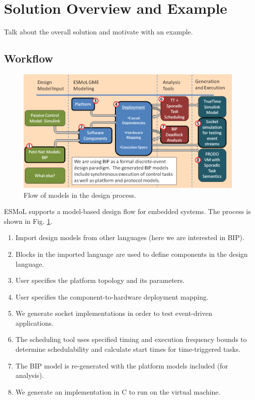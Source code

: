 \section{Solution Overview and Example}
\label{section:solution}

Talk about the overall solution and motivate with an example.

\subsection{Workflow}

\begin{figure}[htb]
	\centering
		\includegraphics[width=1.00\columnwidth]{images/tool_diagram.png}
	\caption{Flow of models in the design process.}
	\label{fig:tool_diagram}
\end{figure}

ESMoL supports a model-based design flow for embedded systems.  The process is shown in Fig. \ref{fig:tool_diagram}.

\begin{enumerate}
\item Import design models from other languages (here we are interested in BIP). 
\item Blocks in the imported language are used to define components in the design language.
\item User specifies the platform topology and its parameters.
\item User specifies the component-to-hardware deployment mapping.
\item We generate socket implementations in order to test event-driven applications.
\item The scheduling tool uses specified timing and execution frequency bounds to determine schedulability and calculate start times for time-triggered tasks.
\item The BIP model is re-generated with the platform models included (for analysis).
\item We generate an implementation in C to run on the virtual machine.
\end{enumerate}


